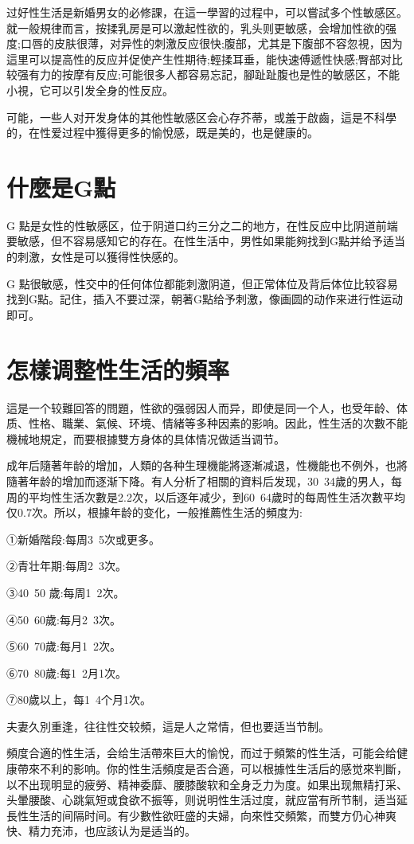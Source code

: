 \documentclass[12pt,UTF8]{ctexbook}
\begin{document}
过好性生活是新婚男女的必修課，在這一學習的过程中，可以嘗試多个性敏感区。就一般規律而言，按揉乳房是可以激起性欲的，乳头则更敏感，会增加性欲的强度;口唇的皮肤很薄，对异性的刺激反应很快;腹部，尤其是下腹部不容忽視，因为這里可以提高性的反应并促使产生性期待;輕揉耳垂，能快速傅遞性快感;臀部对比较强有力的按摩有反应;可能很多人都容易忘記，腳趾趾腹也是性的敏感区，不能小視，它可以引发全身的性反应。

可能，一些人对开发身体的其他性敏感区会心存芥蒂，或羞于啟齒，這是不科學的，在性爱过程中獲得更多的愉悅感，既是美的，也是健康的。

\section{什麼是G點}

G 點是女性的性敏感区，位于阴道口约三分之二的地方，在性反应中比阴道前端要敏感，但不容易感知它的存在。在性生活中，男性如果能夠找到G點并给予适当的刺激，女性是可以獲得性快感的。

G 點很敏感，性交中的任何体位都能刺激阴道，但正常体位及背后体位比较容易找到G點。記住，插入不要过深，朝著G點给予刺激，像画圆的动作来进行性运动即可。

\section{怎樣调整性生活的頻率}

這是一个较難回答的問題，性欲的强弱因人而异，即使是同一个人，也受年龄、体质、性格、職業、氣候、环境、情緒等多种因素的影响。因此，性生活的次數不能機械地規定，而要根據雙方身体的具体情况做适当调节。

成年后隨著年龄的增加，人類的各种生理機能將逐漸减退，性機能也不例外，也將隨著年龄的增加而逐渐下降。有人分析了相關的資料后发现，30~34歲的男人，每周的平均性生活次數是2.2次，以后逐年减少，到60~64歲时的每周性生活次數平均仅0.7次。所以，根據年龄的变化，一般推薦性生活的頻度为:

①新婚階段:每周3~5次或更多。

②青壮年期:每周2~3次。

③40~50 歲:每周1~2次。

④50~60歲:每月2~3次。

⑤60~70歲:每月1~2次。

⑥70~80歲:每1~2月1次。

⑦80歲以上，每1~4个月1次。

夫妻久別重逢，往往性交较頻，這是人之常情，但也要适当节制。

頻度合適的性生活，会给生活帶來巨大的愉悅，而过于頻繁的性生活，可能会给健康帶來不利的影响。你的性生活頻度是否合適，可以根據性生活后的感觉來判斷，以不出现明显的疲勞、精神委靡、腰膝酸软和全身乏力为度。如果出现無精打采、头暈腰酸、心跳氣短或食欲不振等，则说明性生活过度，就应當有所节制，适当延長性生活的间隔时间。有少數性欲旺盛的夫婦，向來性交頻繁，而雙方仍心神爽快、精力充沛，也应該认为是适当的。
\end{document}
